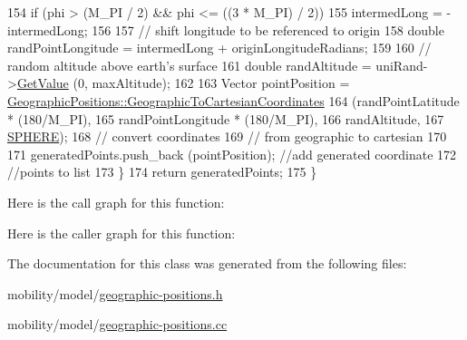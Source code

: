 \begin{DoxyCode}
154       \textcolor{keywordflow}{if} (phi > (M\_PI / 2) && phi <= ((3 * M\_PI) / 2))
155       intermedLong = -intermedLong;
156 
157       \textcolor{comment}{// shift longitude to be referenced to origin}
158       \textcolor{keywordtype}{double} randPointLongitude = intermedLong + originLongitudeRadians; 
159 
160       \textcolor{comment}{// random altitude above earth's surface}
161       \textcolor{keywordtype}{double} randAltitude = uniRand->\hyperlink{classns3_1_1UniformRandomVariable_a03822d8c86ac51e9aa83bbc73041386b}{GetValue} (0, maxAltitude);
162 
163       Vector pointPosition = 
      \hyperlink{classns3_1_1GeographicPositions_aabb0202391e635fbd7c934d345b0da31}{GeographicPositions::GeographicToCartesianCoordinates} 
164                              (randPointLatitude * (180/M\_PI), 
165                               randPointLongitude * (180/M\_PI),
166                               randAltitude,
167                               \hyperlink{classns3_1_1GeographicPositions_a434138b76563c284972bc08a9c4a6882a96850ee7fd8e61d1b68344cc4a4949f6}{SPHERE});
168                               \textcolor{comment}{// convert coordinates }
169                               \textcolor{comment}{// from geographic to cartesian}
170 
171       generatedPoints.push\_back (pointPosition); \textcolor{comment}{//add generated coordinate }
172                                                       \textcolor{comment}{//points to list}
173     \}
174   \textcolor{keywordflow}{return} generatedPoints;
175 \}
\end{DoxyCode}


Here is the call graph for this function\+:




Here is the caller graph for this function\+:




The documentation for this class was generated from the following files\+:\begin{DoxyCompactItemize}
\item 
mobility/model/\hyperlink{geographic-positions_8h}{geographic-\/positions.\+h}\item 
mobility/model/\hyperlink{geographic-positions_8cc}{geographic-\/positions.\+cc}\end{DoxyCompactItemize}
